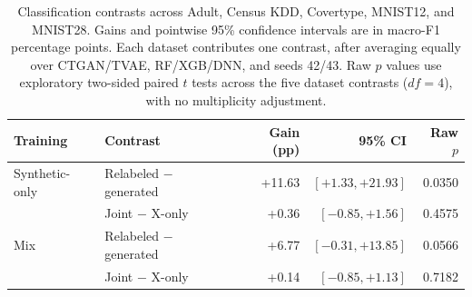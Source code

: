 \begin{table}[t]
\centering
\setlength{\tabcolsep}{8pt}
\begin{tabular}{@{}llrrr@{}}
\toprule
\textbf{Training} & \textbf{Contrast} & \textbf{Gain (pp)} & \textbf{95\% CI} & \textbf{Raw $p$} \\
\midrule
Synthetic-only & Relabeled $-$ generated & +11.63 & $[+1.33, +21.93]$ & 0.0350 \\
 & Joint $-$ X-only & +0.36 & $[-0.85, +1.56]$ & 0.4575 \\
\midrule
Mix & Relabeled $-$ generated & +6.77 & $[-0.31, +13.85]$ & 0.0566 \\
 & Joint $-$ X-only & +0.14 & $[-0.85, +1.13]$ & 0.7182 \\
\bottomrule
\end{tabular}
\caption{Classification contrasts across Adult, Census KDD, Covertype, MNIST12, and MNIST28. Gains and pointwise 95\% confidence intervals are in macro-F1 percentage points. Each dataset contributes one contrast, after averaging equally over CTGAN/TVAE, RF/XGB/DNN, and seeds 42/43. Raw $p$ values use exploratory two-sided paired $t$ tests across the five dataset contrasts ($df=4$), with no multiplicity adjustment.}
\label{tab:classification-contrasts}
\end{table}
